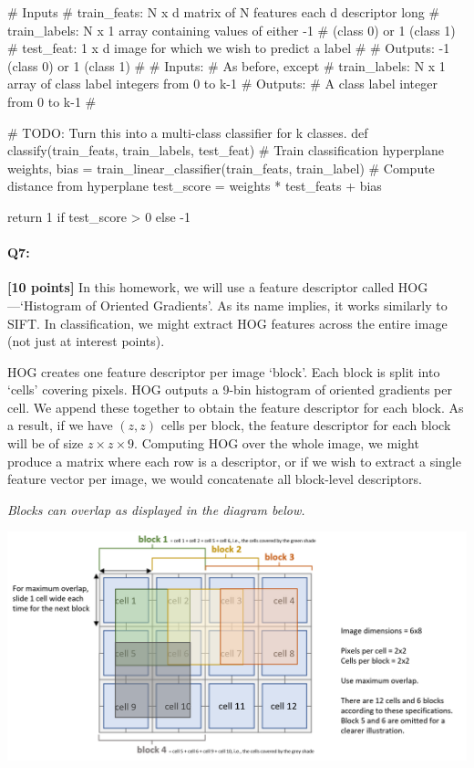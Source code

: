 \begin{python}
# Inputs
#   train_feats: N x d matrix of N features each d descriptor long
#   train_labels: N x 1 array containing values of either -1 
#               (class 0) or 1 (class 1)
#   test_feat: 1 x d image for which we wish to predict a label
#
#   Outputs: -1 (class 0) or 1 (class 1)
#
# Inputs:
#    As before, except
#    train_labels: N x 1 array of class label integers from 0 to k-1
# Outputs:
#    A class label integer from 0 to k-1
#

# TODO: Turn this into a multi-class classifier for k classes.
def classify(train_feats, train_labels, test_feat)
    # Train classification hyperplane
    weights, bias = train_linear_classifier(train_feats, train_label)
    # Compute distance from hyperplane
    test_score = weights * test_feats + bias

    return 1 if test_score > 0 else -1
\end{python}


\pagebreak

\paragraph{Q7:} \textbf{[10 points]} In this homework, we will use a feature descriptor called HOG---`Histogram of Oriented Gradients'. As its name implies, it works similarly to SIFT. In classification, we might extract HOG features across the entire image (not just at interest points).

HOG creates one feature descriptor per image `block'. Each block is split into `cells' covering pixels. HOG outputs a 9-bin histogram of oriented gradients per cell. We append these together to obtain the feature descriptor for each block. As a result, if we have $(z,z)$ cells per block, the feature descriptor for each block will be of size $z \times z \times 9$. Computing HOG over the whole image, we might produce a matrix where each row is a descriptor, or if we wish to extract a single feature vector per image, we would concatenate all block-level descriptors.

\emph{Blocks can overlap as displayed in the diagram below.}

    \includegraphics[width=1.3\textwidth]{images/hog-diagram.png}

